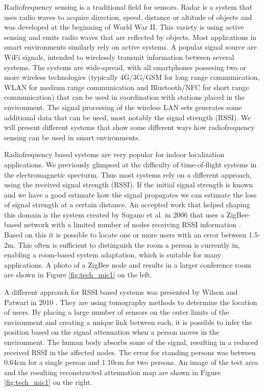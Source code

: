 Radiofrequency sensing is a traditional field for sensors. Radar is a system that uses radio waves to acquire direction, speed, distance or altitude of objects and was developed at the beginning of World War II. This variety is using active sensing and emits radio waves that are reflected by objects. Most applications in smart environments similarly rely on active systems. A popular signal source are WiFi signals, intended to wirelessly transmit information between several systems. The systems are wide-spread, with all smartphones possesing two or more wireless technologies (typically 4G/3G/GSM for long range communication, WLAN for medium range communication and Bluetooth/NFC for short range communication) that can be used in coordination with stations placed in the environment. The signal processing of the wireless LAN sets generates some additional data that can be used, most notably the signal strength (RSSI). We will present different systems that show some different ways how radiofrequency sensing can be used in smart environments.

Radiofrequency based systems are very popular for indoor localization applications. We previously glimpsed at the difficulty of time-of-flight systems in the electromagnetic specturm. Thus most systems rely on a different approach, using the received signal strength (RSSI). If the initial signal strength is known and we have a good estimate how the signal propagates we can estimate the loss of signal strength at a certain distance. An accepted work that helped shaping this domain is the system created by Sugano et al. in 2006 that uses a ZigBee-based network with a limited number of nodes receiving RSSI information \cite{sugano2006indoor}. Based on this it is possible to locate one or more users with an error between 1.5-2m. This often is sufficient to distinguish the room a person is currently in, enabling a room-based system adaptation, which is suitable for many applications. A photo of a ZigBee node and results in a larger conference room are shown in Figure \ref{fig:tech_mic1} on the left.

A different approach for RSSI based systems was presented by Wilson and Patwari in 2010 \cite{wilson2010radio}. They are using tomography methods to determine the location of users. By placing a large number of sensors on the outer limits of the environment and creating a unique link between each, it is possible to infer the position based on the signal attenuation when a person moves in the environment. The human body absorbs some of the signal, resulting in a reduced received RSSI in the affected nodes. The error for standing persons was between 0.64cm for a single person and 1.10cm for two persons. An image of the test area and the resulting reconstructed attenuation map are shown in Figure \ref{fig:tech_mic1} on the right.

